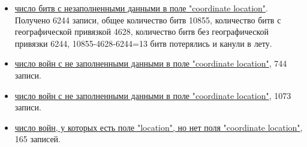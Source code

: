 \begin{itemize}
\item{}
\href{https://query.wikidata.org/#%23List%20of%20battle%20with%20unfilled%20property%20%27location%27%20%0ASELECT%20%3Fbattle%20%3FbattleLabel%20%3Flocation%0AWHERE%0A%7B%0A%20%20%3Fbattle%20wdt%3AP31%20wd%3AQ178561.%20%23instance%20of%20battle%0A%20%20FILTER%20NOT%20EXISTS%20%7B%20%3Fbattle%20wdt%3AP625%20%5B%5D%20%7D%20%23if%20property%20location%20is%20unfilled%0A%20%20SERVICE%20wikibase%3Alabel%20%7B%20bd%3AserviceParam%20wikibase%3Alanguage%20%22en%22%7D%0A%7D}{число битв с незаполненными данными в поле "coordinate location"}. Получено 6244 записи, общее количество битв 10855, количество битв с географической привязкой 4628, количество битв без географической привязки 6244, 10855-4628-6244=13 битв потерялись и канули в лету.

\item
\href{https://query.wikidata.org/#%23List%20of%20war%20with%20unfilled%20property%20%27location%27%20%20%0ASELECT%20%3Fwar%20%3FwarLabel%20%3Flocation%0AWHERE%0A%7B%0A%20%20%3Fwar%20wdt%3AP31%20wd%3AQ198.%20%23instance%20of%20war%0A%20%20FILTER%20NOT%20EXISTS%20%7B%20%3Fwar%20wdt%3AP625%20%5B%5D%20%7D%20%23if%20property%20location%20is%20unfilled%0A%20%20SERVICE%20wikibase%3Alabel%20%7B%20bd%3AserviceParam%20wikibase%3Alanguage%20%22en%22%7D%0A%7D}{число войн с не заполненными данными в поле "coordinate location"}, 744 записи.


\item{}
\href{https://query.wikidata.org/#%23List%20of%20battle%20with%20unfilled%20property%20%27location%27%20%0ASELECT%20%3FbattleLabel%20%3Flocation%0AWHERE%0A%7B%0A%20%20%3Fbattle%20wdt%3AP31%20wd%3AQ178561.%20%23instance%20of%20battle%0A%20%20%3Fbattle%20wdt%3AP276%20%3Flocation%20%23display%20location%0A%20%20FILTER%20NOT%20EXISTS%20%7B%20%3Fbattle%20wdt%3AP625%20%5B%5D%20%7D%20%23if%20property%20location%20is%20unfilled%0A%20%20SERVICE%20wikibase%3Alabel%20%7B%20bd%3AserviceParam%20wikibase%3Alanguage%20%22en%22%7D%0A%7D}{число войн с не заполненными данными в поле "coordinate location"}, 1073 записи.

\item{}
\href{https://query.wikidata.org/#%23List%20of%20war%20with%20unfilled%20property%20%27location%27%20%20%0ASELECT%20%3FwarLabel%20%3Flocation%0AWHERE%0A%7B%0A%20%20%3Fwar%20wdt%3AP31%20wd%3AQ198.%20%23instance%20of%20war%0A%20%20%3Fwar%20wdt%3AP276%20%3Flocation%20%23display%20location%0A%20%20FILTER%20NOT%20EXISTS%20%7B%20%3Fwar%20wdt%3AP625%20%5B%5D%20%7D%20%23if%20property%20location%20is%20unfilled%0A%20%20SERVICE%20wikibase%3Alabel%20%7B%20bd%3AserviceParam%20wikibase%3Alanguage%20%22en%22%7D%0A%7D}{число войн, у которых есть поле "location", но нет поля "coordinate location"}, 165 записей.


\end{itemize}
